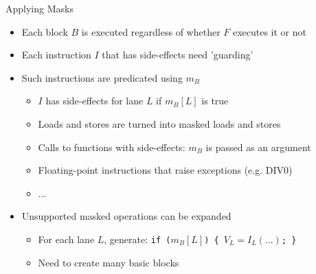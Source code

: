 \begin{frame}{Applying Masks}

\begin{itemize}
    \item Each block $B$ is executed regardless of whether $F$ executes it or not
    \item Each instruction $I$ that has side-effects need 'guarding'
    \item Such instructions are predicated using $m_B$
    \begin{itemize}
        \item $I$ has side-effects for lane $L$ if $m_B[L]$ is true
        \item Loads and stores are turned into masked loads and stores
        \item Calls to functions with side-effects: $m_B$ is passed as an argument
        \item Floating-point instructions that raise exceptions (e.g. DIV0)
        \item ...
    \end{itemize}
    \item Unsupported masked operations can be expanded
    \begin{itemize}
        \item For each lane $L$, generate: \texttt{if ($m_B[L]$) \{ $V_L=I_L(...)$; \}}
        \item Need to create many basic blocks
    \end{itemize}
\end{itemize}

\end{frame}


